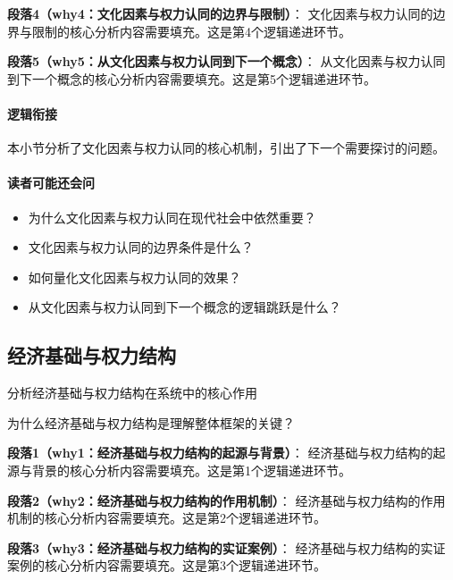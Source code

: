 \documentclass[../main.tex]{subfiles}
\begin{document}
{{\textbf{段落4（why4：文化因素与权力认同的边界与限制）}：
文化因素与权力认同的边界与限制的核心分析内容需要填充。这是第4个逻辑递进环节。


\textbf{段落5（why5：从文化因素与权力认同到下一个概念）}：
从文化因素与权力认同到下一个概念的核心分析内容需要填充。这是第5个逻辑递进环节。


\paragraph*{逻辑衔接}
本小节分析了文化因素与权力认同的核心机制，引出了下一个需要探讨的问题。

\paragraph*{读者可能还会问}
\begin{itemize}
\item 为什么文化因素与权力认同在现代社会中依然重要？
\item 文化因素与权力认同的边界条件是什么？
\item 如何量化文化因素与权力认同的效果？
\item 从文化因素与权力认同到下一个概念的逻辑跳跃是什么？
\end{itemize}


\subsection{经济基础与权力结构}

\begin{motivation}
分析经济基础与权力结构在系统中的核心作用
\end{motivation}

\begin{logicmap}
[逻辑链占位]
\end{logicmap}

\begin{questionbox}
为什么经济基础与权力结构是理解整体框架的关键？
\end{questionbox}

\textbf{段落1（why1：经济基础与权力结构的起源与背景）}：
经济基础与权力结构的起源与背景的核心分析内容需要填充。这是第1个逻辑递进环节。


\textbf{段落2（why2：经济基础与权力结构的作用机制）}：
经济基础与权力结构的作用机制的核心分析内容需要填充。这是第2个逻辑递进环节。


\textbf{段落3（why3：经济基础与权力结构的实证案例）}：
经济基础与权力结构的实证案例的核心分析内容需要填充。这是第3个逻辑递进环节。


}}
\end{document}
